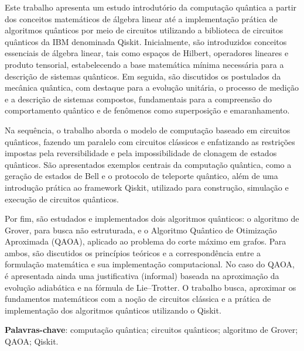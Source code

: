\setlength{\absparsep}{18pt} %
\begin{resumo}

Este trabalho apresenta um estudo introdutório da computação quântica a partir dos conceitos matemáticos de álgebra linear até a implementação prática de algoritmos quânticos por meio de circuitos utilizando a biblioteca de circuitos quânticos da IBM denominada Qiskit. Inicialmente, são introduzidos conceitos essenciais de álgebra linear, tais como espaços de Hilbert, operadores lineares e produto tensorial, estabelecendo a base matemática mínima necessária para a descrição de sistemas quânticos. Em seguida, são discutidos os postulados da mecânica quântica, com destaque para a evolução unitária, o processo de medição e a descrição de sistemas compostos, fundamentais para a compreensão do comportamento quântico e de fenômenos como superposição e emaranhamento.

Na sequência, o trabalho aborda o modelo de computação baseado em circuitos quânticos, fazendo um paralelo com circuitos clássicos e enfatizando as restrições impostas pela reversibilidade e pela impossibilidade de clonagem de estados quânticos. São apresentados exemplos centrais da computação quântica, como a geração de estados de Bell e o protocolo de teleporte quântico, além de uma introdução prática ao framework Qiskit, utilizado para construção, simulação e execução de circuitos quânticos.

Por fim, são estudados e implementados dois algoritmos quânticos: o algoritmo de Grover, para busca não estruturada, e o Algoritmo Quântico de Otimização Aproximada (QAOA), aplicado ao problema do corte máximo em grafos. Para ambos, são discutidos os princípios teóricos e a correspondência entre a formulação matemática e sua implementação computacional. No caso do QAOA, é apresentada ainda uma justificativa (informal) baseada na aproximação da evolução adiabática e na fórmula de Lie--Trotter. O trabalho busca, aproximar os fundamentos matemáticos com a noção de circuitos clássica e a prática de implementação dos algoritmos quânticos utilizando o Qiskit.

 \textbf{Palavras-chave}: computação quântica; circuitos quânticos; algoritmo de Grover; QAOA; Qiskit.
\end{resumo}


